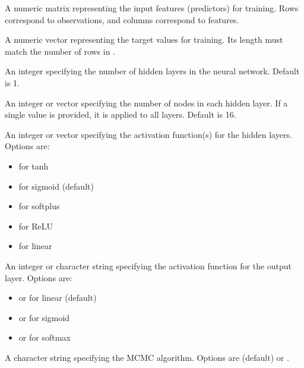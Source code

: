 \documentclass[a4paper]{book}
\begin{document}
%
\begin{Arguments}
\begin{ldescription}
\item[\code{train\_x}] A numeric matrix representing the input features (predictors) for training. Rows correspond to observations, and columns correspond to features.

\item[\code{train\_y}] A numeric vector representing the target values for training. Its length must match the number of rows in .

\item[\code{L}] An integer specifying the number of hidden layers in the neural network. Default is 1.

\item[\code{nodes}] An integer or vector specifying the number of nodes in each hidden layer. If a single value is provided, it is applied to all layers. Default is 16.

\item[\code{act\_fn}] An integer or vector specifying the activation function(s) for the hidden layers. Options are:
\begin{itemize}

\item{}  for tanh
\item{}  for sigmoid (default)
\item{}  for softplus
\item{}  for ReLU
\item{}  for linear

\end{itemize}


\item[\code{out\_act\_fn}] An integer or character string specifying the activation function for the output layer. Options are:
\begin{itemize}

\item{}  or  for linear (default)
\item{}  or  for sigmoid
\item{}  or  for softmax

\end{itemize}


\item[\code{algorithm}] A character string specifying the MCMC algorithm. Options are  (default) or .


\end{ldescription}
\end{Arguments}
\end{document}
